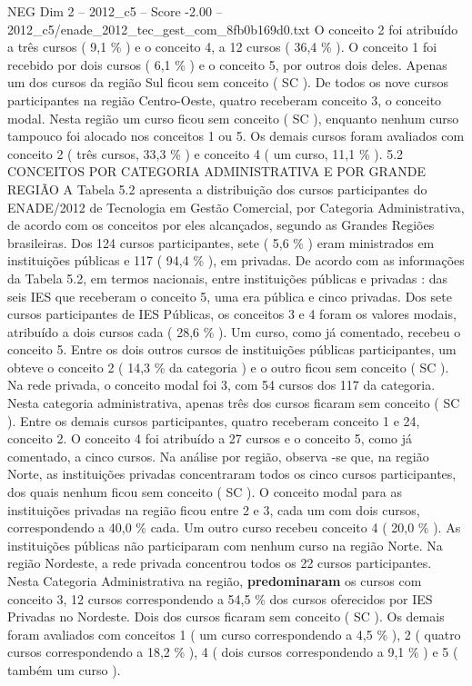 \begin{textsample}{NEG Dim 2 – 2012\_c5 – Score -2.00 – 2012\_c5/enade\_2012\_tec\_gest\_com\_8fb0b169d0.txt}
O conceito 2 foi atribuído a três cursos ( 9,1 \% ) e o conceito 4, a 12 cursos ( 36,4 \% ).
O conceito 1 foi recebido por dois cursos ( 6,1 \% ) e o conceito 5, por outros dois deles.
Apenas um dos cursos da região Sul ficou sem conceito ( SC ).
De todos os nove cursos participantes na região Centro-Oeste, quatro receberam conceito 3, o conceito modal.
Nesta região um curso ficou sem conceito ( SC ), enquanto nenhum curso tampouco foi alocado nos conceitos 1 ou 5.
Os demais cursos foram avaliados com conceito 2 ( três cursos, 33,3 \% ) e conceito 4 ( um curso, 11,1 \% ). 5.2 CONCEITOS POR CATEGORIA ADMINISTRATIVA E POR GRANDE REGIÃO A Tabela 5.2 apresenta a distribuição dos cursos participantes do ENADE/2012 de Tecnologia em Gestão Comercial, por Categoria Administrativa, de acordo com os conceitos por eles alcançados, segundo as Grandes Regiões brasileiras.
Dos 124 cursos participantes, sete ( 5,6 \% ) eram ministrados em instituições públicas e 117 ( 94,4 \% ), em privadas.
De acordo com as informações da Tabela 5.2, em termos nacionais, entre instituições públicas e privadas : das seis IES que receberam o conceito 5, uma era pública e cinco privadas.
Dos sete cursos participantes de IES Públicas, os conceitos 3 e 4 foram os valores modais, atribuído a dois cursos cada ( 28,6 \% ).
Um curso, como já comentado, recebeu o conceito 5.
Entre os dois outros cursos de instituições públicas participantes, um obteve o conceito 2 ( 14,3 \% da categoria ) e o outro ficou sem conceito ( SC ).
Na rede privada, o conceito modal foi 3, com 54 cursos dos 117 da categoria.
Nesta categoria administrativa, apenas três dos cursos ficaram sem conceito ( SC ).
Entre os demais cursos participantes, quatro receberam conceito 1 e 24, conceito 2.
O conceito 4 foi atribuído a 27 cursos e o conceito 5, como já comentado, a cinco cursos.
Na análise por região, observa -se que, na região Norte, as instituições privadas concentraram todos os cinco cursos participantes, dos quais nenhum ficou sem conceito ( SC ).
O conceito modal para as instituições privadas na região ficou entre 2 e 3, cada um com dois cursos, correspondendo a 40,0 \% cada.
Um outro curso recebeu conceito 4 ( 20,0 \% ).
As instituições públicas não participaram com nenhum curso na região Norte.
Na região Nordeste, a rede privada concentrou todos os 22 cursos participantes.
Nesta Categoria Administrativa na região, \textbf{predominaram} os cursos com conceito 3, 12 cursos correspondendo a 54,5 \% dos cursos oferecidos por IES Privadas no Nordeste.
Dois dos cursos ficaram sem conceito ( SC ).
Os demais foram avaliados com conceitos 1 ( um curso correspondendo a 4,5 \% ), 2 ( quatro cursos correspondendo a 18,2 \% ), 4 ( dois cursos correspondendo a 9,1 \% ) e 5 ( também um curso ).

\end{textsample}
